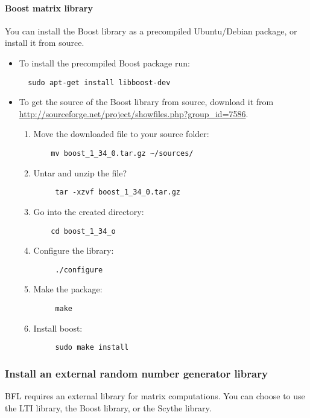 \documentclass[a4paper,10pt]{article}
\begin{document}
\paragraph{Boost matrix library}
You can install the Boost library as a precompiled Ubuntu/Debian
package, or install it from source.
\begin{itemize}
\item To install the precompiled Boost package run:
\begin{verbatim}
  sudo apt-get install libboost-dev
\end{verbatim}
\item To get the source of the Boost library from source, download it from \url{http://sourceforge.net/project/showfiles.php?group_id=7586}.
\begin{enumerate}
 \item Move the downloaded file to your source folder:
	\begin{verbatim}
	mv boost_1_34_0.tar.gz ~/sources/
	\end{verbatim}
 \item Untar and unzip the file?
 	\begin{verbatim}
 	 tar -xzvf boost_1_34_0.tar.gz
 	\end{verbatim}
 \item Go into the created directory:
 	\begin{verbatim}
 	cd boost_1_34_o
 	\end{verbatim}
 \item Configure the library:
	\begin{verbatim}
	 ./configure
	\end{verbatim}
 \item Make the package:
	\begin{verbatim}
	 make
	\end{verbatim}
\item Install boost:
	\begin{verbatim}
	 sudo make install
	\end{verbatim}
\end{enumerate}

\end{itemize}









\subsubsection{Install an external random number generator library}
BFL requires an external library for matrix computations. You can
choose to use the LTI library, the Boost library, or the Scythe library.
\end{document}
